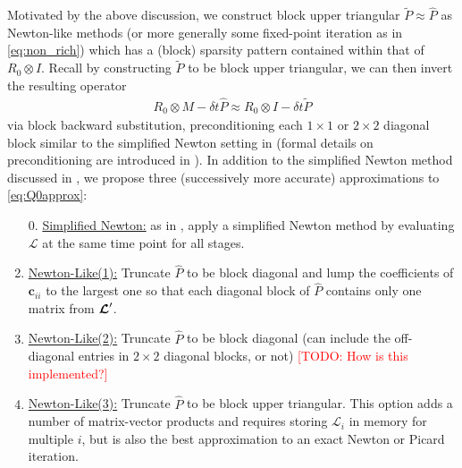 \documentclass[review]{siamart}
\makeatletter
\newcommand{\todo}[1]{\textcolor{red}{[TODO\@: #1]}}
\makeatother
\begin{document}
Motivated by the above discussion, we construct {block upper triangular}
$\widetilde{P} \approx \widehat{P}$ as Newton-like methods (or more
generally some fixed-point iteration as in \eqref{eq:non_rich}) which has
a (block) sparsity pattern contained within that of $R_0 \otimes I$. Recall
by constructing $\widetilde{P}$ to be block upper triangular, we can then
invert the resulting operator
%
\begin{align}
R_0 \otimes M - \delta t \widehat{P} \approx R_0 \otimes I -  \delta t \widetilde{P}
\end{align}
%
via block backward substitution, preconditioning each $1\times 1$
or $2\times 2$ diagonal block similar to the simplified Newton setting in
 (formal details on preconditioning are introduced
in ). In addition to the simplified Newton
method discussed in , we propose three (successively
more accurate) approximations to \eqref{eq:Q0approx}:
\vspace{1ex}
%
\begin{enumerate}
\setlength\itemsep{0.5em}
\item[0.] \underline{Simplified Newton:} as in , apply a
simplified Newton method by evaluating $\mathcal{L}$ at the same time point for
all stages.

\item \underline{Newton-Like(1):} Truncate $\widehat{P}$ to be block diagonal and
lump the coefficients of $\bm{c}_{ii}$ to the largest one so that each diagonal
block of $\widehat{P}$ contains only one matrix from $\bm{{\cal L}}'$.

\item \underline{Newton-Like(2):} Truncate $\widehat{P}$ to be block diagonal
(can include the off-diagonal entries in $2 \times 2$ diagonal blocks, or not)
\todo{How is this implemented?}

\item \underline{Newton-Like(3):} Truncate $\widehat{P}$ to be block upper triangular.
This option adds a number of matrix-vector products and requires storing $\mathcal{L}_i$
in memory for multiple $i$, but is also the best approximation to an exact Newton or
Picard iteration.

\end{enumerate}


\end{document}
